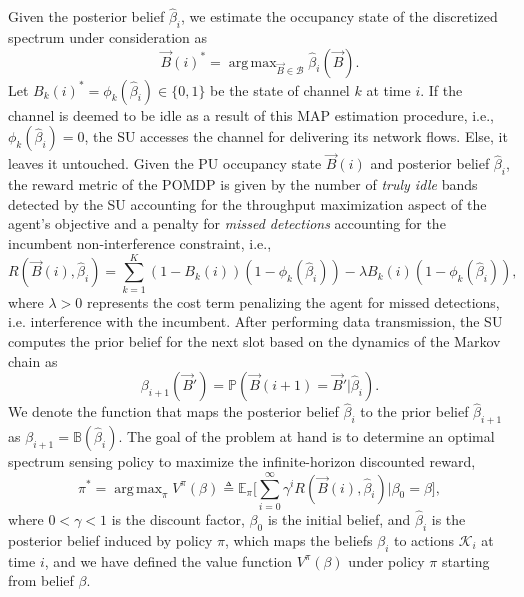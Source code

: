 \documentclass[10pt,twocolumn]{IEEEtran}
\DeclareMathOperator*{\argmax}{arg\,max}
\begin{document}
Given the posterior belief $\hat{\beta}_i$, we estimate the occupancy state of the discretized spectrum under consideration as
\begin{equation}
    \vec{B}(i)^{*} = \argmax_{\vec{B} \in \mathcal{B}} \hat{\beta}_{i}(\vec{B}).
\end{equation}
Let $B_{k}(i)^{*} = \phi_{k}(\hat{\beta}_{i}) \in \{0, 1\}$ be the state of channel $k$ at time $i$. If the channel is deemed to be idle as a result of this MAP estimation procedure, i.e., $\phi_{k}(\hat{\beta}_{i}) = 0$, the SU accesses the channel for delivering its network flows. Else, it leaves it untouched. Given the PU occupancy state $\vec{B}(i)$ and posterior belief $\hat\beta_i$, the reward metric of the POMDP is given by the number of \emph{truly idle} bands detected by the SU accounting for the throughput maximization aspect of the agent's objective and a penalty for \emph{missed detections} accounting for the incumbent non-interference constraint, i.e.,
\begin{equation}\label{12}
    R(\vec{B}(i), \hat{\beta}_i) = \sum_{k=1}^{K} (1 - B_k(i))(1 - \phi_k(\hat{\beta}_{i})) - \lambda B_k(i)(1 - \phi_k(\hat{\beta}_i)),
\end{equation}
where $\lambda > 0$ represents the cost term penalizing the agent for missed detections, i.e. interference with the incumbent. After performing data transmission, the SU computes the prior belief for the next slot based on the dynamics of the Markov chain as
\begin{equation}\label{13}
    \beta_{i+1}(\vec{B}') = \mathbb{P}(\vec{B}(i+1) = \vec{B}'|\hat{\beta}_{i}).
\end{equation}
We denote the function that maps the posterior belief $\hat\beta_i$ to the prior belief $\hat\beta_{i+1}$ as $\beta_{i+1}={\mathbb B}(\hat\beta_i)$.
The goal of the problem at hand is to determine an optimal spectrum sensing policy to maximize the infinite-horizon discounted reward,
\begin{equation}\label{14}
    \pi^{*} = \argmax_{\pi} V^{\pi}(\beta) \triangleq \mathbb{E}_{\pi} \Big[\sum_{i=0}^{\infty} \gamma^{i} R(\vec{B}(i), \hat{\beta}_i)|\beta_0 = \beta\Big],
\end{equation}
where $0 < \gamma < 1$ is the discount factor, $\beta_0$ is the initial belief, and $\hat\beta_i$ is the posterior belief induced by policy $\pi$, which maps the beliefs $\beta_i$ to actions $\mathcal{K}_i$ at time $i$, and we have defined the value function $V^{\pi}(\beta)$ under policy $\pi$ starting from belief $\beta$.
\end{document}
